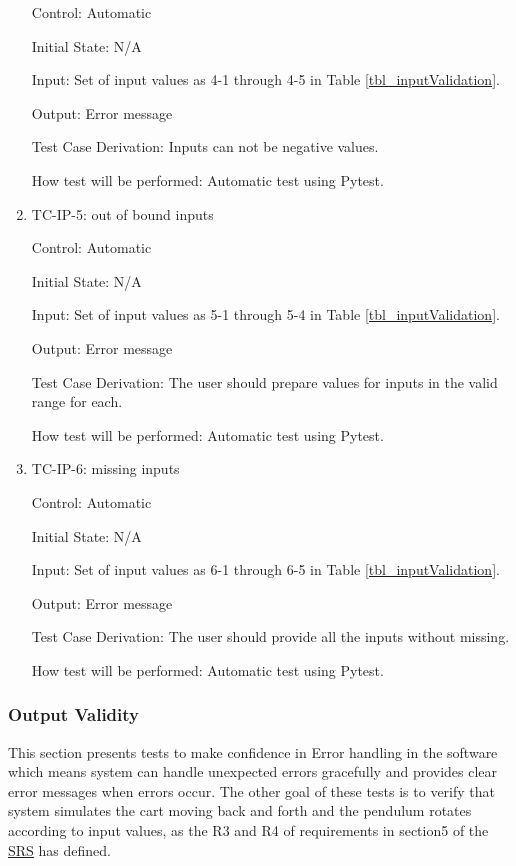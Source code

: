 \documentclass[12pt, titlepage]{article}
\begin{document}
\begin{enumerate}
Control: Automatic
					
Initial State: N/A 
					
Input: Set of input values as 4-1 through 4-5 in Table \ref{tbl_inputValidation}.
					
Output: Error message

Test Case Derivation: Inputs can not be negative values.
					
How test will be performed: Automatic test using Pytest.

\item{TC-IP-5: out of bound inputs}

Control: Automatic
					
Initial State: N/A 
					
Input: Set of input values as 5-1 through 5-4 in Table \ref{tbl_inputValidation}.
					
Output: Error message

Test Case Derivation: The user should prepare values for inputs in the valid range for each.

How test will be performed: Automatic test using Pytest.

\item{TC-IP-6: missing inputs}

Control: Automatic
					
Initial State: N/A 
					
Input: Set of input values as 6-1 through 6-5 in Table \ref{tbl_inputValidation}.
					
Output: Error message

Test Case Derivation: The user should provide all the inputs without missing.
					
					
How test will be performed: Automatic test using Pytest.			
				
\end{enumerate}

\subsubsection{Output Validity \label{out_val}}

This section presents tests to make confidence in Error handling in the software which means system can handle unexpected errors gracefully and provides clear error messages when errors occur.
The other goal of these tests is to verify that system simulates the cart moving back and forth and the pendulum rotates according to input values, as the R3 and R4 of requirements in section5 of the  \href{https://github.com/MinMah23/CAS741-Project/tree/main/docs/SRS/SRS.pdf}{SRS} has defined.
\end{document}
